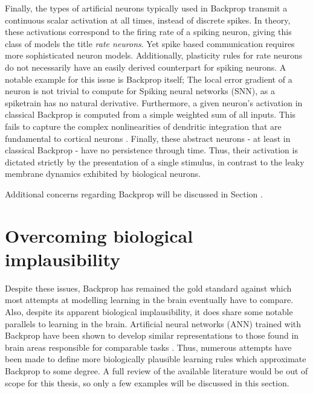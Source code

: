 Finally, the types of artificial neurons typically used in Backprop transmit a continuous scalar activation at all
times, instead of discrete spikes. In theory, these activations correspond to the firing rate of a spiking neuron,
giving this class of models the title \textit{rate neurons}. Yet spike based communication requires more sophisticated
neuron models. Additionally, plasticity rules for rate neurons do not necessarily have an easily derived counterpart for
spiking neurons. A notable example for this issue is Backprop itself; The local error gradient of a neuron is not
trivial to compute for Spiking neural networks (SNN), as a spiketrain has no natural derivative. Furthermore, a given
neuron's activation in classical Backprop is computed from a simple weighted sum of all inputs. This fails to capture
the complex nonlinearities of dendritic integration that are fundamental to cortical neurons
\citep{Gerstner2009,sjostrom2008dendritic,Eyal2018}. Finally, these abstract neurons - at least in classical Backprop -
have no persistence through time. Thus, their activation is dictated strictly by the presentation of a single stimulus,
in contrast to the leaky membrane dynamics exhibited by biological neurons.\newline

Additional concerns regarding Backprop will be discussed in Section \todo{}.


\section{Overcoming biological implausibility}

Despite these issues, Backprop has remained the gold standard against which most attempts at modelling learning in the
brain eventually have to compare. Also, despite its apparent biological implausibility, it does share some notable
parallels to learning in the brain. Artificial neural networks (ANN) trained with Backprop have been shown to develop
similar representations to those found in brain areas responsible for comparable tasks
\citep{Yamins2016,Whittington2018,KhalighRazavi2014,Kubilius2016}. Thus, numerous attempts have been made to define more
biologically plausible learning rules which approximate Backprop to some degree. A full review of the available
literature would be out of scope for this thesis, so only a few examples will be discussed in this section.

